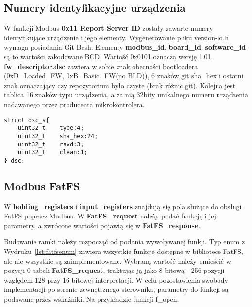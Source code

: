 \documentclass[12pt,a4paper]{article}
\begin{document}


\clearpage

\subsection{Numery identyfikacyjne urządzenia}
W funkcji Modbus \textbf{0x11 Report Server ID} zostały zawarte numery identyfikujące urządzenie i jego elementy. Wygenerowanie pliku version-id.h wymaga posiadania Git Bash. Elementy \textbf{modbus\_id}, \textbf{board\_id}, \textbf{software\_id} są to wartości zakodowane BCD. Wartość 0x0101 oznacza wersję 1.01. \textbf{fw\_descriptor.dsc} zawiera w sobie znak obecności bootloadera (0xD=Loaded\_FW, 0xB=Basic\_FW(no BLD)), 6 znaków git sha\_hex i ostatni znak oznaczający czy repozytorium było czyste (brak różnic git).
Kolejna jest tablica 16 znaków typu urządzenia, a za nią 32bity unikalnego numeru urządzenia nadawanego przez producenta mikrokontrolera.

\begin{lstlisting}[float=!h, style=customc, caption={struktura \textbf{fw\_descriptor.dsc}}, label={lst:fwdesc}, belowskip=-10pt]
struct dsc_s{
	uint32_t    type:4;
	uint32_t    sha_hex:24;
	uint32_t    rsvd:3;
	uint32_t    clean:1;
} dsc;
\end{lstlisting}




\subsection{Modbus FatFS}
W \textbf{holding\_registers} i \textbf{input\_registers} znajdują się pola służące do obsługi FatFS poprzez Modbus. W \textbf{FatFS\_request} należy podać funkcję i jej parametry, a zwrócone wartości pojawią się w \textbf{FatFS\_response}.

Budowanie ramki należy rozpocząć od podania wywoływanej funkji. Typ enum z Wydruku~\ref{lst:fatfsenum} zawiera wszystkie funkcje dostępne w bibliotece FatFS, ale nie wszystkie są zaimplementowane. Wybraną wartość należy umieścić w pozycji 0 tabeli \textbf{FatFS\_request}, traktując ją jako 8-bitową - 256 pozycji względem 128 przy 16-bitowej interpretacji.
W celu pozostawienia swobody implementacji po stronie zewnętrznego sterownika, parametry do funkcji są podawane przez wskaźniki. Na przykładzie funkcji f\_open:
\end{document}
